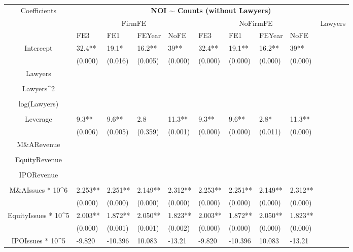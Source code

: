 \documentclass{article}
\begin{document}
\begin{table}[H]
\centering
\begin{tabular}{|clllllllll|}
\hline
\multirow{3}{*}{Coefficients} & \multicolumn{9}{c|}{\textbf{NOI $\sim$ Counts (without Lawyers)}} \\
\cline{2-10}
& \multicolumn{4}{c}{FirmFE} & \multicolumn{4}{c}{NoFirmFE} & \multirow{2}{*}{Lawyers} \\
\cline{2-9}
& FE3 & FE1 & FEYear & NoFE & FE3 & FE1 & FEYear & NoFE &  \\
\hline
 
Intercept & 32.4** & 19.1* & 16.2** & 39** & 32.4** & 19.1** & 16.2** & 39** & \\ 
   & (0.000) & (0.016) & (0.005) & (0.000) & (0.000) & (0.000) & (0.000) & (0.000) & \\ 
  Lawyers &  &  &  &  &  &  &  &  & \\ 
   &  &  &  &  &  &  &  &  & \\ 
  Lawyers^2 &  &  &  &  &  &  &  &  & \\ 
   &  &  &  &  &  &  &  &  & \\ 
  log(Lawyers) &  &  &  &  &  &  &  &  & \\ 
   &  &  &  &  &  &  &  &  & \\ 
  Leverage & 9.3** & 9.6** & 2.8 & 11.3** & 9.3** & 9.6** & 2.8* & 11.3** & \\ 
   & (0.006) & (0.005) & (0.359) & (0.001) & (0.000) & (0.000) & (0.011) & (0.000) & \\ 
  M\&ARevenue &  &  &  &  &  &  &  &  & \\ 
   &  &  &  &  &  &  &  &  & \\ 
  EquityRevenue &  &  &  &  &  &  &  &  & \\ 
   &  &  &  &  &  &  &  &  & \\ 
  IPORevenue &  &  &  &  &  &  &  &  & \\ 
   &  &  &  &  &  &  &  &  & \\ 
  M\&AIssues * 10^6 & 2.253** & 2.251** & 2.149** & 2.312** & 2.253** & 2.251** & 2.149** & 2.312** & \\ 
   & (0.000) & (0.000) & (0.000) & (0.000) & (0.000) & (0.000) & (0.000) & (0.000) & \\ 
  EquityIssues * 10^5 & 2.003** & 1.872** & 2.050** & 1.823** & 2.003** & 1.872** & 2.050** & 1.823** & \\ 
   & (0.000) & (0.001) & (0.001) & (0.002) & (0.000) & (0.000) & (0.000) & (0.000) & \\ 
  IPOIssues * 10^5 & -9.820 & -10.396 & 10.083 & -13.21 & -9.820 & -10.396 & 10.083 & -13.21 & \\ 

\end{tabular}
\end{table}
\end{document}
